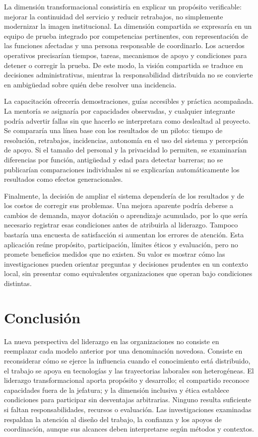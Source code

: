 \documentclass[12pt,letterpaper,oneside]{article}
\begin{document}
La dimensión transformacional consistiría en explicar un propósito verificable: mejorar la continuidad del servicio y reducir retrabajos, no simplemente modernizar la imagen institucional. La dimensión compartida se expresaría en un equipo de prueba integrado por competencias pertinentes, con representación de las funciones afectadas y una persona responsable de coordinarlo. Los acuerdos operativos precisarían tiempos, tareas, mecanismos de apoyo y condiciones para detener o corregir la prueba. De este modo, la visión compartida se traduce en decisiones administrativas, mientras la responsabilidad distribuida no se convierte en ambigüedad sobre quién debe resolver una incidencia.

La capacitación ofrecería demostraciones, guías accesibles y práctica acompañada. La mentoría se asignaría por capacidades observadas, y cualquier integrante podría advertir fallas sin que hacerlo se interpretara como deslealtad al proyecto. Se compararía una línea base con los resultados de un piloto: tiempo de resolución, retrabajos, incidencias, autonomía en el uso del sistema y percepción de apoyo. Si el tamaño del personal y la privacidad lo permiten, se examinarían diferencias por función, antigüedad y edad para detectar barreras; no se publicarían comparaciones individuales ni se explicarían automáticamente los resultados como efectos generacionales.

Finalmente, la decisión de ampliar el sistema dependería de los resultados y de los costos de corregir sus problemas. Una mejora aparente podría deberse a cambios de demanda, mayor dotación o aprendizaje acumulado, por lo que sería necesario registrar esas condiciones antes de atribuirla al liderazgo. Tampoco bastaría una encuesta de satisfacción si aumentan los errores de atención. Esta aplicación reúne propósito, participación, límites éticos y evaluación, pero no promete beneficios medidos que no existen. Su valor es mostrar cómo las investigaciones pueden orientar preguntas y decisiones prudentes en un contexto local, sin presentar como equivalentes organizaciones que operan bajo condiciones distintas.

\section*{Conclusión}

La nueva perspectiva del liderazgo en las organizaciones no consiste en reemplazar cada modelo anterior por una denominación novedosa. Consiste en reconsiderar cómo se ejerce la influencia cuando el conocimiento está distribuido, el trabajo se apoya en tecnologías y las trayectorias laborales son heterogéneas. El liderazgo transformacional aporta propósito y desarrollo; el compartido reconoce capacidades fuera de la jefatura; y la dimensión inclusiva y ética establece condiciones para participar sin desventajas arbitrarias. Ninguno resulta suficiente si faltan responsabilidades, recursos o evaluación. Las investigaciones examinadas respaldan la atención al diseño del trabajo, la confianza y los apoyos de coordinación, aunque sus alcances deben interpretarse según métodos y contextos.
\end{document}
